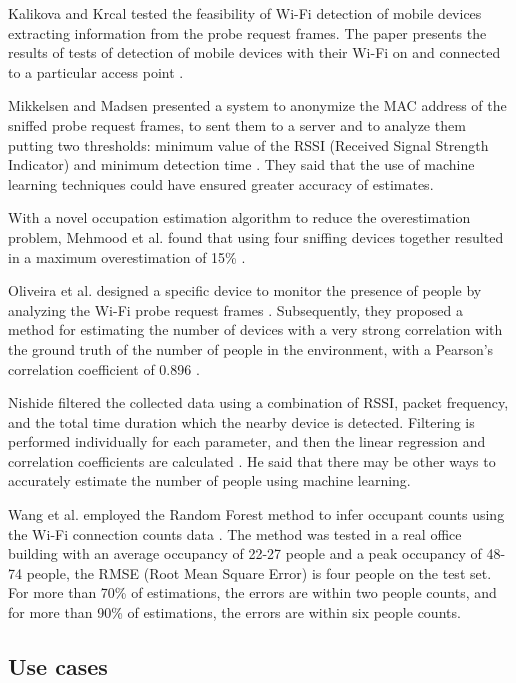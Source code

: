 Kalikova and Krcal tested the feasibility of Wi-Fi detection of mobile devices extracting information from the probe request frames. The paper presents the results of tests of detection of mobile devices with their Wi-Fi on and connected to a particular access point  \cite{kalikova2017people}.

Mikkelsen and Madsen presented a system to anonymize the MAC address of the sniffed probe request frames, to sent them to a server and to analyze them putting two thresholds: minimum value of the RSSI (Received Signal Strength Indicator) and minimum detection time \cite{mikkelsen2016public}. They said that the use of machine learning techniques could have ensured greater accuracy of estimates.

With a novel occupation estimation algorithm to reduce the overestimation problem, Mehmood et al. found that using four sniffing devices together resulted in a maximum overestimation of 15\% \cite{mehmood2019occupancy}.

Oliveira et al. designed a specific device to monitor the presence of people by analyzing the Wi-Fi probe request frames \cite{oliveira2018sherlock}. Subsequently, they proposed a method for estimating the number of devices with a very strong correlation with the ground truth of the number of people in the environment, with a Pearson's correlation coefficient of 0.896 \cite{oliveira2019mobile}.

Nishide filtered the collected data using a combination of RSSI, packet frequency, and the total time duration which the nearby device is detected. Filtering is performed individually for each parameter, and then the linear regression and correlation coefficients are calculated  \cite{nishide2019filter}. He said that there may be other ways to accurately estimate the number of people using machine learning.

Wang et al. employed the Random Forest method to infer occupant counts using the Wi-Fi connection counts data \cite{wang2019inferring}. The method was tested in a real office building with an average occupancy of 22-27 people and a peak occupancy of 48-74 people, the RMSE (Root Mean Square Error) is four people on the test set. For more than 70\% of estimations, the errors are within two people counts, and for more than 90\% of estimations, the errors are within six people counts. 


\vspace{0.1 cm}
\subsection{Use cases}
\label{sec:cases}
\vspace{0.1 cm}

